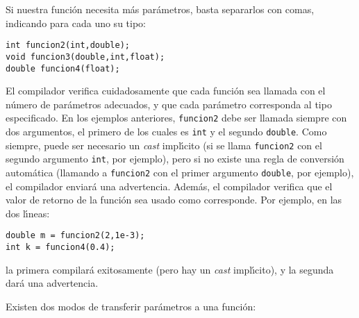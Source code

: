 Si nuestra funci\'on necesita m\'as par\'ametros, basta separarlos con
comas, indicando para cada uno su tipo:
\begin{verbatim}
int funcion2(int,double);
void funcion3(double,int,float);
double funcion4(float);
\end{verbatim}
El compilador verifica cuidadosamente que cada funci\'on sea llamada
con el n\'umero de par\'ametros adecuados, y que cada par\'ametro
corresponda al tipo especificado. En los ejemplos anteriores,
\verb+funcion2+ debe ser llamada siempre con dos argumentos, el
primero de los cuales es \verb+int+ y el segundo \verb+double+. Como
siempre, puede ser necesario un {\em cast\/} impl\'{\i}cito (si se
llama \verb+funcion2+ con el segundo argumento \verb+int+, por
ejemplo), pero si no existe una regla de conversi\'on autom\'atica
(llamando a \verb+funcion2+ con el primer argumento \verb+double+, por
ejemplo), el compilador enviar\'a una advertencia. Adem\'as, el
compilador verifica que el valor de retorno de la funci\'on sea usado
como corresponde. Por ejemplo, en las dos l\'{\i}neas:
\begin{verbatim}
double m = funcion2(2,1e-3);
int k = funcion4(0.4);
\end{verbatim}
la primera compilar\'a exitosamente (pero hay un {\em cast\/}
impl\'{\i}cito), y la segunda dar\'a una advertencia. 



Existen dos modos de transferir
par{\'a}metros a una funci{\'o}n:

